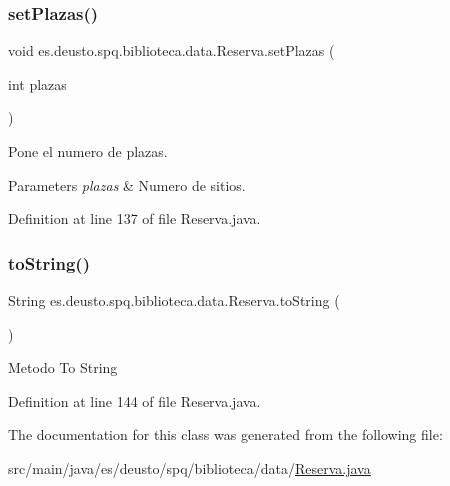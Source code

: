 \subsubsection{\texorpdfstring{set\+Plazas()}{setPlazas()}}
{\footnotesize\ttfamily void es.\+deusto.\+spq.\+biblioteca.\+data.\+Reserva.\+set\+Plazas (\begin{DoxyParamCaption}\item[{int}]{plazas }\end{DoxyParamCaption})}

Pone el numero de plazas. 
\begin{DoxyParams}{Parameters}
{\em plazas} & Numero de sitios. \\
\hline
\end{DoxyParams}


Definition at line 137 of file Reserva.\+java.

\mbox{\label{classes_1_1deusto_1_1spq_1_1biblioteca_1_1data_1_1_reserva_a07deac8f8e9adabfc2f927a22593c322}} 
\subsubsection{\texorpdfstring{to\+String()}{toString()}}
{\footnotesize\ttfamily String es.\+deusto.\+spq.\+biblioteca.\+data.\+Reserva.\+to\+String (\begin{DoxyParamCaption}{ }\end{DoxyParamCaption})}

Metodo To String 

Definition at line 144 of file Reserva.\+java.



The documentation for this class was generated from the following file\+:\begin{DoxyCompactItemize}
\item 
src/main/java/es/deusto/spq/biblioteca/data/\mbox{\hyperlink{_reserva_8java}{Reserva.\+java}}\end{DoxyCompactItemize}
